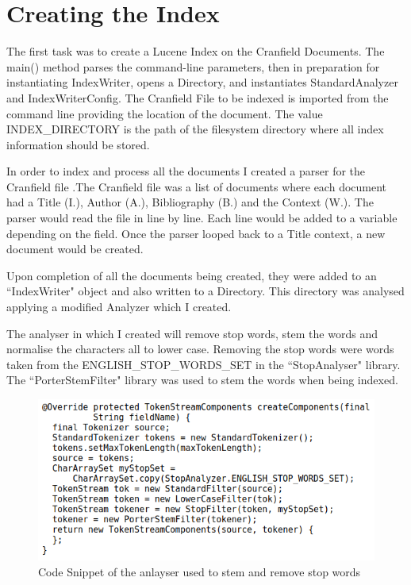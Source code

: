 \section{Creating the Index}

The first task was to create a Lucene Index on the Cranfield Documents. The main() method parses the command-line parameters, then in preparation for instantiating IndexWriter, opens a Directory, and instantiates StandardAnalyzer and IndexWriterConfig. The Cranfield File to be indexed is imported from the command line providing the location of the document. The value INDEX\_DIRECTORY is the path of the filesystem directory where all index information should be stored.  \par 

In order to index and process all the documents I created a parser for the Cranfield file .The Cranfield file was a list of documents where each document had a Title (I.), Author (A.), Bibliography (B.) and the Context (W.). The parser would read the file in line by line. Each line would be added to a variable depending on the field. Once the parser looped back to a Title context, a new document would be created. \par 
	
Upon completion of all the documents being created, they were added to an ``IndexWriter" object and also written to a Directory. This directory was analysed applying a modified Analyzer which I created. \par

The analyser in which I created will remove stop words, stem the words and normalise the characters all to lower case. Removing the stop words were words taken from the ENGLISH\_STOP\_WORDS\_SET in the ``StopAnalyser" library. The ``PorterStemFilter" library was used to stem the words when being indexed.  \par

	\begin{figure}[ht!]
		\begin{center}
			\includegraphics[scale=.4 ]{2} 
			\caption{Code Snippet of the anlayser used to stem and remove stop words}
			\label{fig:1}
		\end{center}
	\end{figure} \par

